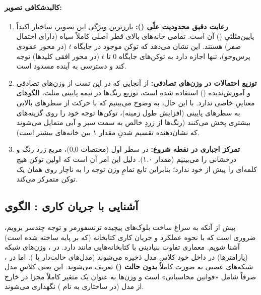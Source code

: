 \documentclass{article}
\begin{document}
\paragraph{کالبدشکافی تصویر:}
\begin{enumerate}
	\item \textbf{رعایت دقیق محدودیت علّی ():} 
	بارزترین ویژگی این تصویر، ساختار اکیداً پایین‌مثلثیِ () آن است. تمامی خانه‌های بالای قطر اصلی کاملاً سیاه (دارای احتمال صفر) هستند. این نشان می‌دهد که توکن موجود در جایگاه $t$ (در محور عمودی پرس‌وجو)، تنها اجازه دارد به توکن‌های جایگاه $0$ تا $t$ (در محور افقی کلیدها) توجه کند و دسترسی به آینده مسدود است.
	
	\item \textbf{توزیع احتمالات در وزن‌های تصادفی:}
	از آنجایی که در این تست از وزن‌های تصادفی و آموزش‌ندیده () استفاده شده است، توزیع رنگ‌ها در نیمه پایینی مثلث، الگوهای معناییِ خاصی ندارد. با این حال، به وضوح می‌بینیم که با حرکت از سطرهای بالایی به سطرهای پایینی (افزایش طول زمینه)، توکن‌ها توجه خود را روی گزینه‌های بیشتری پخش می‌کنند (رنگ‌ها از زردِ خالص به سمت سبز و آبی متمایل می‌شوند که نشان‌دهنده تقسیم شدنِ مقدار ۱ بین خانه‌های بیشتر است).
	
	\item \textbf{تمرکز اجباری در نقطه شروع:}
	در سطر اول (مختصات 0,0)، مربع زرد رنگ و درخشانی را می‌بینیم (مقدار ۱.۰). دلیل این امر آن است که اولین توکن هیچ کلمه‌ای را پیش از خود ندارد؛ بنابراین تابع  تمامِ وزن توجه را به ناچار روی همان یک توکن متمرکز می‌کند.
\end{enumerate}

\subsection{آشنایی با جریان کاری : الگوی }

پیش از آنکه به سراغ ساخت بلوک‌های پیچیده ترنسفورمر و توجه چندسر برویم، ضروری است که با نحوه عملکرد و جریان کاری کتابخانه  (که بر پایه  ساخته شده است) آشنا شویم. معماری  تفاوت بنیادینی با کتابخانه‌هایی مانند  دارد. در ، وزن‌های شبکه (پارامترها) در داخل خود کلاسِ مدل ذخیره می‌شوند (مدل‌های حالت‌دار یا ). اما در ، شبکه‌های عصبی به صورت کاملاً \textbf{بدون حالت ()} تعریف می‌شوند. این یعنی کلاسِ مدل صرفاً شامل «قوانین محاسباتی» است و وزن‌ها به عنوان یک متغیر کاملاً مجزا در خارج از مدل (در ساختاری به نام ) نگهداری می‌شوند.
\end{document}
